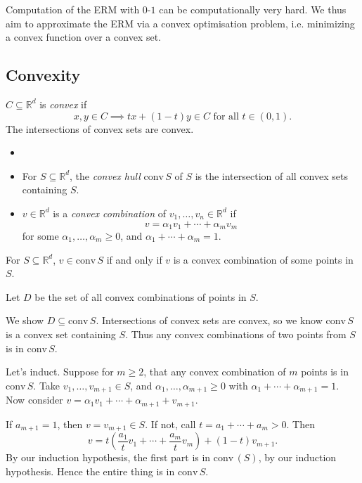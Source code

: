 \documentclass[12pt]{article}
\begin{document}
Computation of the ERM with $0$-$1$ can be computationally very hard. We thus aim to approximate the ERM via a convex optimisation problem, i.e. minimizing a convex function over a convex set.

\subsection{Convexity}
\label{sub:conv}

$C \subseteq \mathbb{R}^d$ is \emph{convex} if
\[
	x, y \in C \implies tx + (1 - t)y \in C \text{ for all } t \in (0, 1).
\]
The intersections of convex sets are convex.

\begin{definition}
	\begin{itemize}
		\item[]
		\item For $S \subseteq \mathbb{R}^d$, the \emph{convex hull} $\mathrm{conv}\, S$ of $S$ is the intersection of all convex sets containing $S$.
		\item $v \in \mathbb{R}^d$ is a \emph{convex combination} of $v_1, \ldots, v_n \in \mathbb{R}^d$ if
			\[
			v = \alpha_1 v_1 + \cdots + \alpha_m v_m
			\]
			for some $\alpha_1, \ldots, \alpha_m \geq 0$, and $\alpha_1 + \cdots + \alpha_m = 1$.
	\end{itemize}
\end{definition}

\begin{lemma}
	For $S \subseteq \mathbb{R}^d$, $v \in \mathrm{conv}\, S$ if and only if $v$ is a convex combination of some points in $S$.
\end{lemma}

\begin{proofbox}
	Let $D$ be the set of all convex combinations of points in $S$.

	We show $D \subseteq \mathrm{conv} \, S$. Intersections of convex sets are convex, so we know $\mathrm{conv} \, S$ is a convex set containing $S$. Thus any convex combinations of two points from $S$ is in $\mathrm{conv} \, S$.

	Let's induct. Suppose for $m \geq 2$, that any convex combination of $m$ points is in $\mathrm{conv} \, S$. Take $v_1, \ldots, v_{m+1} \in S$, and $\alpha_1, \ldots, \alpha_{m+1} \geq 0$ with $\alpha_1 + \cdots + \alpha_{m+1} = 1$. Now consider $v = \alpha_1 v_1 + \cdots + \alpha_{m+1} + v_{m+1}$.

	If $a_{m+1} = 1$, then $v = v_{m+1} \in S$. If not, call $t = a_1 + \cdots + a_m > 0$. Then
	\[
	v = t \left( \frac{a_1}{t} v_1 + \cdots + \frac{a_m}{t} v_m \right) + (1 - t) v_{m+1}.
	\]
	By our induction hypothesis, the first part is in $\mathrm{conv} \, (S)$, by our induction hypothesis. Hence the entire thing is in $\mathrm{conv} \, S$.
\end{proofbox}
\end{document}
